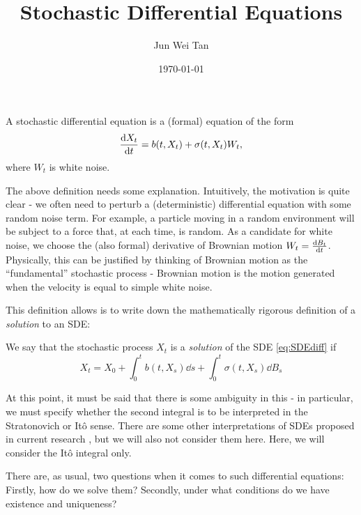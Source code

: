 \documentclass[prb,12pt]{revtex4-2}
\theoremstyle{definition}
\theoremstyle{definition}
\theoremstyle{definition}
\begin{document}
	\title{Stochastic Differential Equations}
	\author{Jun Wei Tan}
	\date{\today}
	\maketitle

\begin{Definition}
	A stochastic differential equation is a (formal) equation of the form
	\begin{equation}\label{eq:SDEdiff}
	\dv{X_t}{t}=b(t, X_t)+\sigma(t, X_t)W_t,
\end{equation}
	where $W_t$ is white noise. 
\end{Definition}
The above definition needs some explanation. Intuitively, the motivation is quite clear - we often need to perturb a (deterministic) differential equation with some random noise term. For example, a particle moving in a random environment will be subject to a force that, at each time, is random. As a candidate for white noise, we choose the (also formal) derivative of Brownian motion $W_t = \dv{B_t}{t}$. Physically, this can be justified by thinking of Brownian motion as the ``fundamental'' stochastic process - Brownian motion is the motion generated when the velocity is equal to simple white noise. 

This definition allows is to write down the mathematically rigorous definition of a \emph{solution} to an SDE:
\begin{Definition}
	We say that the stochastic process $X_t$ is a \emph{solution} of the SDE \eqref{eq:SDEdiff} if
	\[X_t = X_0+\int_0^t b(t, X_s)\dd{s}+ \int_0^t \sigma(t, X_s)\dd{B_s}\]
\end{Definition}
At this point, it must be said that there is some ambiguity in this - in particular, we must specify whether the second integral is to be interpreted in the Stratonovich or Itô sense. There are some other interpretations of SDEs proposed in current research \cite{Shi_2012}, but we will also not consider them here. Here, we will consider the Itô integral only.

There are, as usual, two questions when it comes to such differential equations: Firstly, how do we solve them? Secondly, under what conditions do we have existence and uniqueness?
\end{document}
